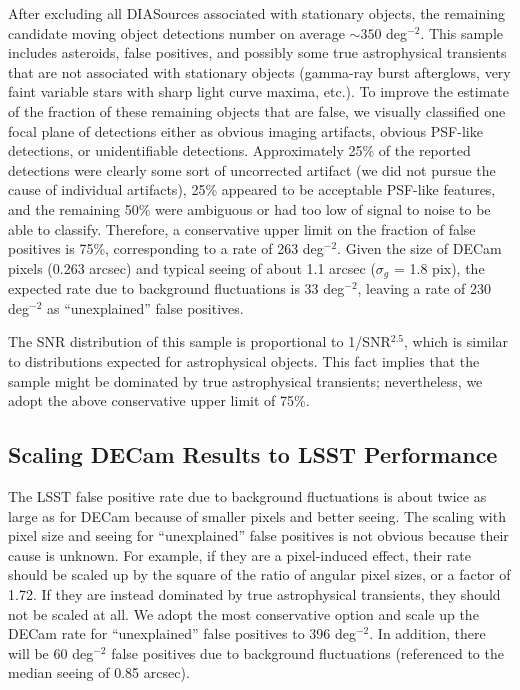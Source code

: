 After excluding all DIASources associated with stationary objects, the
remaining candidate moving object detections number on average $\sim 350$ 
deg$^{-2}$. This sample includes asteroids, false positives, and possibly some
true astrophysical transients that are not associated with stationary objects
(gamma-ray burst afterglows, very faint variable stars with sharp light 
curve maxima, etc.). To improve the estimate of the fraction of these remaining
objects that are false, we visually classified one focal plane of detections either 
as obvious imaging artifacts, obvious PSF-like detections, or unidentifiable
detections. Approximately 25\% of the reported detections were clearly some 
sort of uncorrected artifact (we did not pursue the cause of individual artifacts),
25\% appeared to be acceptable PSF-like features, and the remaining 50\% were
ambiguous or had too low of signal to noise to be able to classify.
Therefore, a conservative upper limit on the fraction of false positives is 75\%,
corresponding to a rate of 263 deg$^{-2}$. Given the size of DECam pixels 
(0.263 arcsec) and typical seeing of about 1.1 arcsec ($\sigma_g$ = 1.8 pix), 
the expected rate due to background fluctuations is 33 deg$^{-2}$, leaving
a rate of 230 deg$^{-2}$ as ``unexplained'' false positives. 

The SNR distribution of this sample is proportional to 1/SNR$^{2.5}$, which
is similar to distributions expected for astrophysical objects. This fact implies
that the sample might be dominated by true astrophysical transients; nevertheless,
we adopt the above conservative upper limit of 75\%.  


\subsection{Scaling DECam Results to LSST Performance} 

The LSST false positive rate due to background fluctuations is about twice
as large as for DECam because of smaller pixels and better seeing. The scaling
with pixel size and seeing for ``unexplained'' false positives is not obvious
because their cause is unknown. For example, if they are a pixel-induced effect, 
their rate should be scaled up by the square of the ratio of angular pixel sizes, or
a factor of 1.72. If they are instead dominated by true astrophysical transients,
they should not be scaled at all. We adopt the most conservative option and 
scale up the DECam rate for ``unexplained'' false positives to 396 deg$^{-2}$. 
In addition, there will be 60 deg$^{-2}$ false positives due to background 
fluctuations (referenced to the median seeing of 0.85 arcsec). 

